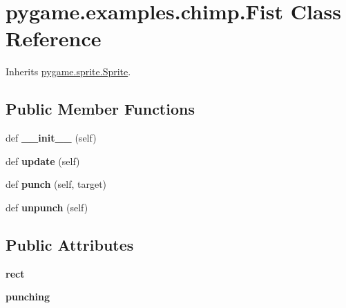 \hypertarget{classpygame_1_1examples_1_1chimp_1_1_fist}{}\section{pygame.\+examples.\+chimp.\+Fist Class Reference}
\label{classpygame_1_1examples_1_1chimp_1_1_fist}


Inherits \hyperlink{classpygame_1_1sprite_1_1_sprite}{pygame.\+sprite.\+Sprite}.

\subsection*{Public Member Functions}
\begin{DoxyCompactItemize}
\item 
\mbox{\label{classpygame_1_1examples_1_1chimp_1_1_fist_a349ff648afc3618d6091dcd4b3f6f9aa}} 
def {\bfseries \+\_\+\+\_\+init\+\_\+\+\_\+} (self)
\item 
\mbox{\label{classpygame_1_1examples_1_1chimp_1_1_fist_adc8c1272f2ce45c14ac28a188e3954a4}} 
def {\bfseries update} (self)
\item 
\mbox{\label{classpygame_1_1examples_1_1chimp_1_1_fist_a708570980fde4012d3f9de54e04af9dc}} 
def {\bfseries punch} (self, target)
\item 
\mbox{\label{classpygame_1_1examples_1_1chimp_1_1_fist_a5cd05e1d0e85f9e3ece929115b3d7dce}} 
def {\bfseries unpunch} (self)
\end{DoxyCompactItemize}
\subsection*{Public Attributes}
\begin{DoxyCompactItemize}
\item 
\mbox{\label{classpygame_1_1examples_1_1chimp_1_1_fist_ad83a2ebf1d32c14dab6fa8bec5176359}} 
{\bfseries rect}
\item 
\mbox{\label{classpygame_1_1examples_1_1chimp_1_1_fist_ab41eb62edc29e2bb4adde18587fe90d3}} 
{\bfseries punching}
\end{DoxyCompactItemize}


